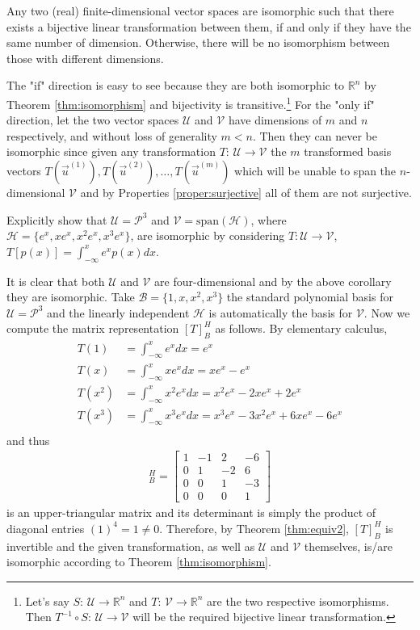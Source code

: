 \begin{proper}
Any two (real) finite-dimensional vector spaces are isomorphic such that there exists a bijective linear transformation between them, if and only if they have the same number of dimension. Otherwise, there will be no isomorphism between those with different dimensions.
\end{proper}
The "if" direction is easy to see because they are both isomorphic to $\mathbb{R}^n$ by Theorem \ref{thm:isomorphism} and bijectivity is transitive.\footnote{Let's say $S$: $\mathcal{U} \to \mathbb{R}^n$ and $T$: $\mathcal{V} \to \mathbb{R}^n$ are the two respective isomorphisms. Then $T^{-1} \circ S$: $\mathcal{U} \to \mathcal{V}$ will be the required bijective linear transformation.} For the "only if" direction, let the two vector spaces $\mathcal{U}$ and $\mathcal{V}$ have dimensions of $m$ and $n$ respectively, and without loss of generality $m < n$. Then they can never be isomorphic since given any transformation $T$: $\mathcal{U} \to \mathcal{V}$ the $m$ transformed basis vectors $T(\vec{u}^{(1)}), T(\vec{u}^{(2)}), \ldots, T(\vec{u}^{(m)})$ which will be unable to span the $n$-dimensional $\mathcal{V}$ and by Properties \ref{proper:surjective} all of them are not surjective.
\begin{exmp}
Explicitly show that $\mathcal{U} = \mathcal{P}^3$ and $\mathcal{V} = \text{span}(\mathcal{H})$, where $\mathcal{H} = \{e^x, xe^x, x^2e^x, x^3e^x\}$, are isomorphic by considering $T: \mathcal{U} \to \mathcal{V}$, $T[p(x)] = \int_{-\infty}^x e^x p(x) dx$.
\end{exmp}
\begin{solution}
It is clear that both $\mathcal{U}$ and $\mathcal{V}$ are four-dimensional and by the above corollary they are isomorphic. Take $\mathcal{B} = \{1, x, x^2, x^3\}$ the standard polynomial basis for $\mathcal{U} = \mathcal{P}^3$ and the linearly independent $\mathcal{H}$ is automatically the basis for $\mathcal{V}$. Now we compute the matrix representation $[T]_B^H$ as follows. By elementary calculus,
\begin{align*}
T(1) &= \int_{-\infty}^x e^x dx = e^x \\
T(x) &= \int_{-\infty}^x xe^x dx = xe^x - e^x \\
T(x^2) &= \int_{-\infty}^x x^2e^x dx = x^2e^x - 2xe^x + 2e^x \\
T(x^3) &= \int_{-\infty}^x x^3e^x dx = x^3e^x - 3x^2e^x + 6xe^x - 6e^x \\
\end{align*}
and thus
\begin{align*}
[T]_B^H = 
\begin{bmatrix}
1 & -1 & 2 & -6 \\ 
0 & 1 & -2 & 6 \\
0 & 0 & 1 & -3 \\
0 & 0 & 0 & 1
\end{bmatrix}
\end{align*}
is an upper-triangular matrix and its determinant is simply the product of diagonal entries $(1)^4 = 1 \neq 0$. Therefore, by Theorem \ref{thm:equiv2}, $[T]_B^H$ is invertible and the given transformation, as well as $\mathcal{U}$ and $\mathcal{V}$ themselves, is/are isomorphic according to Theorem \ref{thm:isomorphism}.
\end{solution}

